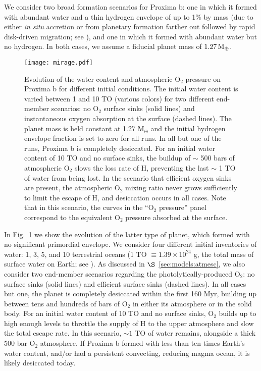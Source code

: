 \documentclass[preprint,12pt]{aastex}
\def\mearth{{\rm\,M_\oplus}}
\begin{document}
We consider two broad formation scenarios for Proxima b: one in which
it formed with abundant water and a thin hydrogen envelope of up to
1\% by mass (due to either \emph{in situ} accretion or from planetary
formation farther out followed by rapid disk-driven migration; see
\cite{Luger15}), and one in which it formed with abundant water but no
hydrogen. In both cases, we assume a fiducial planet mass of $1.27
\mearth$.

\begin{figure}[ht]
\centering
\texttt{[image: mirage.pdf]}
\caption{Evolution of the water content and atmospheric O$_2$ pressure
  on Proxima b for different initial conditions. The initial water
  content is varied between 1 and 10 TO (various colors) for two
  different end-member scenarios: no O$_2$ surface sinks (solid lines)
  and instantaneous oxygen absorption at the surface (dashed
  lines). The planet mass is held constant at 1.27 M$_\oplus$ and the
  initial hydrogen envelope fraction is set to zero for all runs. In
  all but one of the runs, Proxima b is completely desiccated. For an
  initial water content of 10 TO and no surface sinks, the buildup of
  $\sim$ 500 bars of atmospheric O$_2$ slows the loss rate of H,
  preventing the last $\sim$ 1 TO of water from being lost. In the
  scenario that efficient oxygen sinks are present, the atmospheric
  O$_2$ mixing ratio never grows sufficiently to limit the escape of
  H, and desiccation occurs in all cases. Note that in this scenario,
  the curves in the ``O$_2$ pressure'' panel correspond to the
  equivalent O$_2$ pressure absorbed at the surface.}
\label{fig:atmesc:mirage}
\end{figure}

In Fig.~\ref{fig:atmesc:mirage} we show the evolution of the latter
type of planet, which formed with no significant primordial
envelope. We consider four different initial inventories of water: 1,
3, 5, and 10 terrestrial oceans (1 TO $\equiv 1.39\times 10^{24}$ g,
the total mass of surface water on Earth; see \cite{Kasting88}). As
discussed in $\S$~\ref{sec:models:atmesc}, we also consider two end-member
scenarios regarding the photolytically-produced O$_2$: no surface
sinks (solid lines) and efficient surface sinks (dashed lines). In all
cases but one, the planet is completely desiccated within the first
160 Myr, building up between tens and hundreds of bars of O$_2$ in
either its atmosphere or in the solid body. For an initial water
content of 10 TO and no surface sinks, O$_2$ builds up to high enough
levels to throttle the supply of H to the upper atmosphere and slow
the total escape rate. In this scenario, $\sim 1$ TO of water remains,
alongside a thick 500 bar O$_2$ atmosphere. If Proxima b formed with
less than ten times Earth's water content, and/or had a persistent
convecting, reducing magma ocean, it is likely desiccated today.
\end{document}
